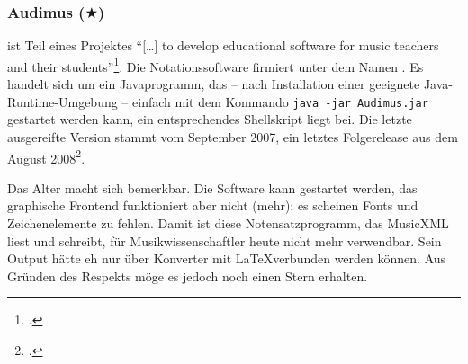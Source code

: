 %
%
%



\subsubsection{Audimus ($\bigstar$)}

 ist Teil eines Projektes \enquote{[\ldots] to develop educational
software for music teachers and their students}\footcite[vgl.][\nopage
wp]{Audimus2008a}. Die Notationssoftware firmiert unter dem Namen
. Es handelt sich um ein Javaprogramm, das -- nach
Installation einer geeignete Java-Runtime-Umgebung -- einfach mit dem Kommando
\texttt{java -jar Audimus.jar} gestartet werden kann, ein entsprechendes
Shellskript liegt bei. Die letzte ausgereifte Version stammt vom September
2007, ein letztes Folgerelease aus dem August 2008\footcite[vgl.][\nopage
wp]{Audimus2008b}.

Das Alter macht sich bemerkbar. Die Software kann gestartet werden, das
graphische Frontend funktioniert aber nicht (mehr): es scheinen Fonts und
Zeichenelemente zu fehlen. Damit ist diese Notensatzprogramm, das MusicXML liest
und schreibt, für Musikwissenschaftler heute nicht mehr verwendbar. Sein Output
hätte eh nur über Konverter mit \LaTeX verbunden werden können. Aus Gründen des
Respekts möge es jedoch noch einen Stern erhalten.



%
